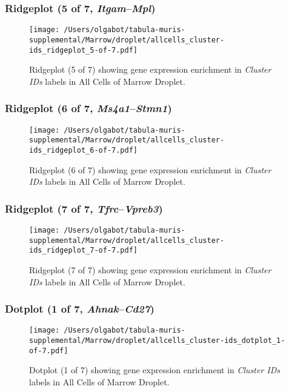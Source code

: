 \clearpage

\subsubsection{Ridgeplot (5 of 7, \emph{Itgam}--\emph{Mpl})}
\begin{figure}[h]
\centering
\texttt{[image: /Users/olgabot/tabula-muris-supplemental/Marrow/droplet/allcells\_cluster-ids\_ridgeplot\_5-of-7.pdf]}

\caption{ Ridgeplot (5 of 7)  showing gene expression enrichment in \emph{Cluster IDs} labels in All Cells of Marrow Droplet. }
\end{figure}


\clearpage

\subsubsection{Ridgeplot (6 of 7, \emph{Ms4a1}--\emph{Stmn1})}
\begin{figure}[h]
\centering
\texttt{[image: /Users/olgabot/tabula-muris-supplemental/Marrow/droplet/allcells\_cluster-ids\_ridgeplot\_6-of-7.pdf]}

\caption{ Ridgeplot (6 of 7)  showing gene expression enrichment in \emph{Cluster IDs} labels in All Cells of Marrow Droplet. }
\end{figure}


\clearpage

\subsubsection{Ridgeplot (7 of 7, \emph{Tfrc}--\emph{Vpreb3})}
\begin{figure}[h]
\centering
\texttt{[image: /Users/olgabot/tabula-muris-supplemental/Marrow/droplet/allcells\_cluster-ids\_ridgeplot\_7-of-7.pdf]}

\caption{ Ridgeplot (7 of 7)  showing gene expression enrichment in \emph{Cluster IDs} labels in All Cells of Marrow Droplet. }
\end{figure}


\clearpage

\subsubsection{Dotplot (1 of 7, \emph{Ahnak}--\emph{Cd27})}
\begin{figure}[h]
\centering
\texttt{[image: /Users/olgabot/tabula-muris-supplemental/Marrow/droplet/allcells\_cluster-ids\_dotplot\_1-of-7.pdf]}

\caption{ Dotplot (1 of 7)  showing gene expression enrichment in \emph{Cluster IDs} labels in All Cells of Marrow Droplet. }
\end{figure}


